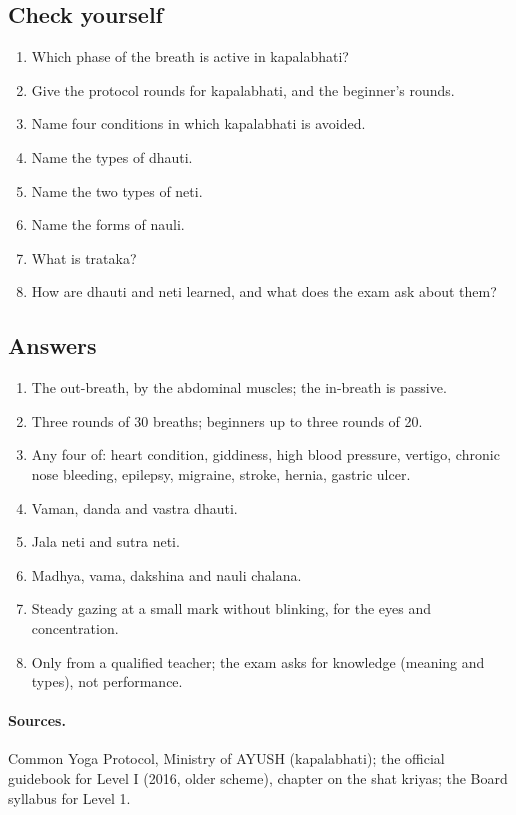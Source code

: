 \subsection*{Check yourself}
\begin{enumerate}
\item Which phase of the breath is active in kapalabhati?
\item Give the protocol rounds for kapalabhati, and the beginner's rounds.
\item Name four conditions in which kapalabhati is avoided.
\item Name the types of dhauti.
\item Name the two types of neti.
\item Name the forms of nauli.
\item What is trataka?
\item How are dhauti and neti learned, and what does the exam ask about them?
\end{enumerate}

\subsection*{Answers}
\begin{enumerate}
\item The out-breath, by the abdominal muscles; the in-breath is passive.
\item Three rounds of 30 breaths; beginners up to three rounds of 20.
\item Any four of: heart condition, giddiness, high blood pressure, vertigo, chronic nose bleeding, epilepsy, migraine, stroke, hernia, gastric ulcer.
\item Vaman, danda and vastra dhauti.
\item Jala neti and sutra neti.
\item Madhya, vama, dakshina and nauli chalana.
\item Steady gazing at a small mark without blinking, for the eyes and concentration.
\item Only from a qualified teacher; the exam asks for knowledge (meaning and types), not performance.
\end{enumerate}

\paragraph{Sources.} Common Yoga Protocol, Ministry of AYUSH (kapalabhati); the official guidebook for Level I (2016, older scheme), chapter on the shat kriyas; the Board syllabus for Level 1.
